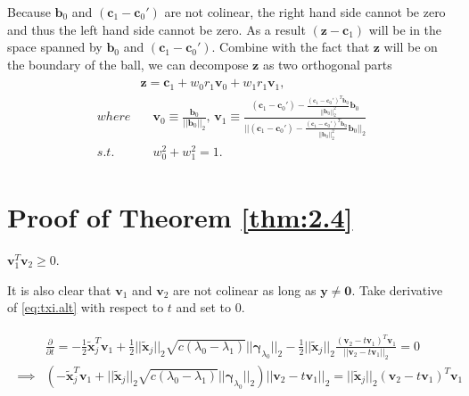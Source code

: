 \begin{enumerate}
    Because $\boldsymbol b_0$ and $(\boldsymbol c_1-\boldsymbol c_0')$ are not colinear, the right hand side cannot be zero and thus the left hand side cannot be zero. As a result $(\boldsymbol z- \boldsymbol c_1)$ will be in the space spanned by $\boldsymbol b_0$ and $(\boldsymbol c_1-\boldsymbol c_0')$. Combine with the fact that $\boldsymbol z$ will be on the boundary of the ball, we can decompose $\boldsymbol z$ as two orthogonal parts 
    \begin{gather}
        \begin{aligned}
            &\boldsymbol z=\boldsymbol c_1+w_0 r_1\boldsymbol v_0+w_1 r_1\boldsymbol v_1,\\
            where&\quad \boldsymbol v_0\equiv\frac{\boldsymbol b_0}{||\boldsymbol b_0||_2},\, \boldsymbol v_1\equiv \frac{(\boldsymbol c_1-\boldsymbol c_0')-\frac{(\boldsymbol c_1-\boldsymbol c_0')^T\boldsymbol b_0}{||\boldsymbol b_0||_2^2}\boldsymbol b_0}{||(\boldsymbol c_1-\boldsymbol c_0')-\frac{(\boldsymbol c_1-\boldsymbol c_0')^T\boldsymbol b_0}{||\boldsymbol b_0||_2^2}\boldsymbol b_0||_2}\\
            s.t.&\quad w_0^2+w_1^2=1.
        \end{aligned}
    \end{gather}
\end{enumerate}

\section{Proof of Theorem \ref{thm:2.4}}

\begin{lemma}
    \label{lem:2.4.1}
    $\boldsymbol v_1^T \boldsymbol v_2\geq 0$.
\end{lemma}

It is also clear that $\boldsymbol v_1$ and $\boldsymbol v_2$ are not colinear as long as $\boldsymbol y\neq \boldsymbol0$. Take derivative of \eqref{eq:txi.alt} with respect to $t$ and set to 0.

\begin{gather}
    \label{eq:2.4.1}
    \begin{aligned}
        &\frac{\partial}{\partial t}=-\frac{1}{2}\tilde{\boldsymbol x}_j^T\boldsymbol v_1+\frac{1}{2}||\tilde{\boldsymbol x}_j||_2\sqrt{c(\lambda_0-\lambda_1)}||\boldsymbol\gamma_{\lambda_0}||_2-\frac{1}{2}||\tilde{\boldsymbol x}_j||_2\frac{(\boldsymbol v_2-t\boldsymbol v_1)^T\boldsymbol v_1}{||\boldsymbol v_2-t\boldsymbol v_1||_2}=0\\
        \implies & \left(-\tilde{\boldsymbol x}_j^T\boldsymbol v_1+||\tilde{\boldsymbol x}_j||_2\sqrt{c(\lambda_0-\lambda_1)}||\boldsymbol\gamma_{\lambda_0}||_2\right)||\boldsymbol v_2-t\boldsymbol v_1||_2=||\tilde{\boldsymbol x}_j||_2(\boldsymbol v_2-t\boldsymbol v_1)^T\boldsymbol v_1
    \end{aligned}
\end{gather}

